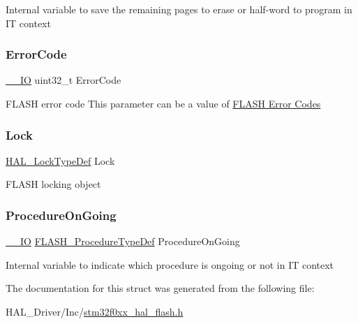 Internal variable to save the remaining pages to erase or half-\/word to program in IT context \mbox{\label{struct_f_l_a_s_h___process_type_def_a123c5063e6a3b1901b2fbe5f88c53a7e}} 
\subsubsection{\texorpdfstring{Error\+Code}{ErrorCode}}
{\footnotesize\ttfamily \hyperlink{core__sc300_8h_aec43007d9998a0a0e01faede4133d6be}{\+\_\+\+\_\+\+IO} uint32\+\_\+t Error\+Code}

F\+L\+A\+SH error code This parameter can be a value of \hyperlink{group___f_l_a_s_h___error___codes}{F\+L\+A\+SH Error Codes} \mbox{\label{struct_f_l_a_s_h___process_type_def_ad4cf225029dbefe8d3fe660c33b8bb6b}} 
\subsubsection{\texorpdfstring{Lock}{Lock}}
{\footnotesize\ttfamily \hyperlink{stm32f0xx__hal__def_8h_ab367482e943333a1299294eadaad284b}{H\+A\+L\+\_\+\+Lock\+Type\+Def} Lock}

F\+L\+A\+SH locking object \mbox{\label{struct_f_l_a_s_h___process_type_def_a5e0516d2d3654cef74de4ed427c16d26}} 
\subsubsection{\texorpdfstring{Procedure\+On\+Going}{ProcedureOnGoing}}
{\footnotesize\ttfamily \hyperlink{core__sc300_8h_aec43007d9998a0a0e01faede4133d6be}{\+\_\+\+\_\+\+IO} \hyperlink{group___f_l_a_s_h___exported___types_ga2b0268387bc11bcab76be9ce7c43eaaf}{F\+L\+A\+S\+H\+\_\+\+Procedure\+Type\+Def} Procedure\+On\+Going}

Internal variable to indicate which procedure is ongoing or not in IT context 

The documentation for this struct was generated from the following file\+:\begin{DoxyCompactItemize}
\item 
H\+A\+L\+\_\+\+Driver/\+Inc/\hyperlink{stm32f0xx__hal__flash_8h}{stm32f0xx\+\_\+hal\+\_\+flash.\+h}\end{DoxyCompactItemize}
